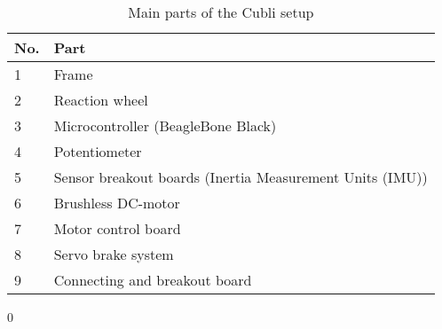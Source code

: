 \begin{table}[H]
	\begin{tabular}{|l|p{6.7cm}|}
		\hline %
		\textbf{No.} &\textbf{Part} 			\\
		\hline %
		1            & Frame           			\\
		\hline %
		2            & Reaction wheel      		\\
		\hline %
		3            & Microcontroller (BeagleBone Black)  \\
		\hline %
		4            & Potentiometer			\\
		\hline %
		5            & Sensor breakout boards (Inertia Measurement Units (IMU))       			\\
		\hline %
		6            & Brushless DC-motor   	\\
		\hline %
		7            & Motor control board     	\\
		\hline %
		8            & Servo brake system 		    	\\
		\hline %
		9            & Connecting and breakout board		    	\\
		\hline %
	\end{tabular}0
	\caption{Main parts of the Cubli setup}
\label{TableAAUCubliComponent}
\end{table}




